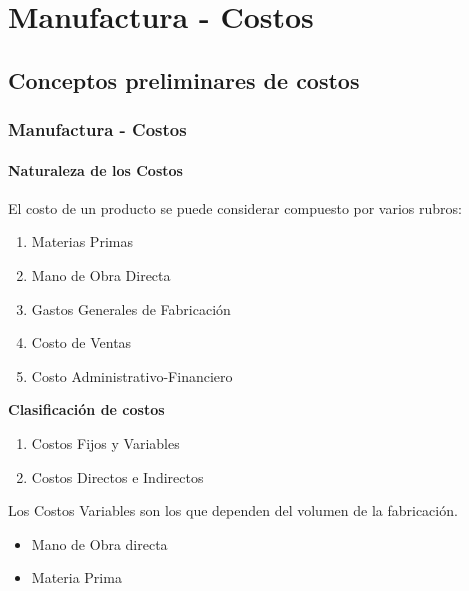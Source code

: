 \documentclass[letterpaper,10pt,spanish]{sphinxmanual}
\begin{document}
\section{Manufactura - Costos}
\label{manufactura-costos::doc}\label{manufactura-costos:manufactura-costos}

\subsection{Conceptos preliminares de costos}
\label{manufactura-costos:conceptos-preliminares-de-costos}

\subsubsection{Manufactura - Costos}
\label{manufactura-costos-conceptos::doc}\label{manufactura-costos-conceptos:manufactura-costos}

\paragraph{Naturaleza de los Costos}
\label{manufactura-costos-conceptos:naturaleza-de-los-costos}
El costo de un producto se puede considerar compuesto por varios rubros:
\begin{enumerate}
\item {} 
Materias Primas

\item {} 
Mano de Obra Directa

\item {} 
Gastos Generales de Fabricación

\item {} 
Costo de Ventas

\item {} 
Costo Administrativo-Financiero

\end{enumerate}

\textbf{Clasificación de costos}
\begin{enumerate}
\item {} 
Costos Fijos y Variables

\item {} 
Costos Directos e Indirectos

\end{enumerate}

Los Costos Variables son los que dependen del volumen de la fabricación.
\begin{itemize}
\item {} 
Mano de Obra directa

\item {} 
Materia Prima

\end{itemize}
\end{document}
